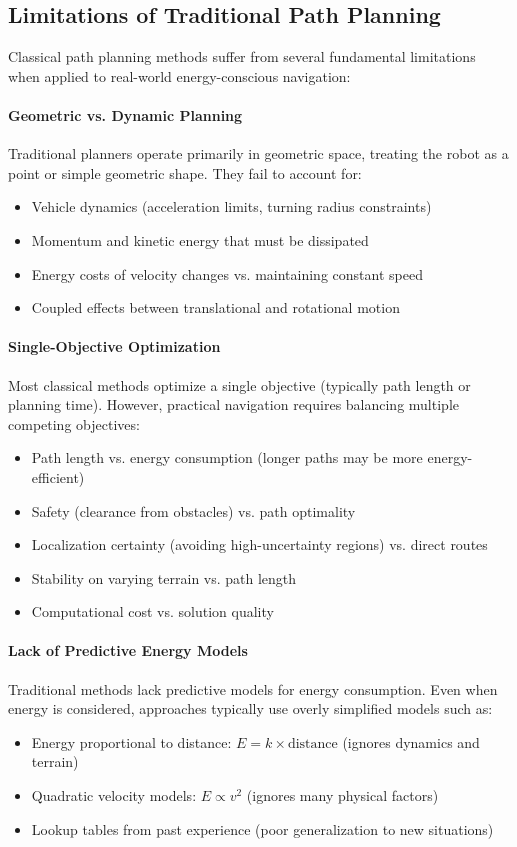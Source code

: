 \subsection{Limitations of Traditional Path Planning}

Classical path planning methods suffer from several fundamental limitations when applied to real-world energy-conscious navigation:

\paragraph{Geometric vs. Dynamic Planning}
Traditional planners operate primarily in geometric space, treating the robot as a point or simple geometric shape. They fail to account for:
\begin{itemize}
    \item Vehicle dynamics (acceleration limits, turning radius constraints)
    \item Momentum and kinetic energy that must be dissipated
    \item Energy costs of velocity changes vs. maintaining constant speed
    \item Coupled effects between translational and rotational motion
\end{itemize}

\paragraph{Single-Objective Optimization}
Most classical methods optimize a single objective (typically path length or planning time). However, practical navigation requires balancing multiple competing objectives:
\begin{itemize}
    \item Path length vs. energy consumption (longer paths may be more energy-efficient)
    \item Safety (clearance from obstacles) vs. path optimality
    \item Localization certainty (avoiding high-uncertainty regions) vs. direct routes
    \item Stability on varying terrain vs. path length
    \item Computational cost vs. solution quality
\end{itemize}

\paragraph{Lack of Predictive Energy Models}
Traditional methods lack predictive models for energy consumption. Even when energy is considered, approaches typically use overly simplified models such as:
\begin{itemize}
    \item Energy proportional to distance: $E = k \times \text{distance}$ (ignores dynamics and terrain)
    \item Quadratic velocity models: $E \propto v^2$ (ignores many physical factors)
    \item Lookup tables from past experience (poor generalization to new situations)
\end{itemize}

